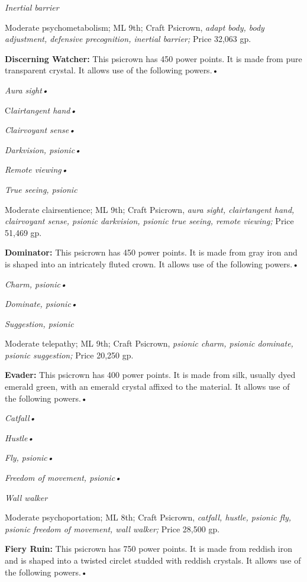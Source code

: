 \documentclass{article}
\begin{document}
\textit{Inertial barrier}

Moderate psychometabolism; ML 9th; Craft Psicrown, \textit{adapt body, body adjustment, 
defensive precognition, inertial barrier; }Price 32,063 gp.

\textbf{Discerning Watcher:} This psicrown has 450 power points. It is made from 
pure transparent crystal. It allows use of the following powers.• 

\textit{Aura sight• }

\parindent=3pt
C\textit{lairtangent hand• }

\parindent=0pt
\textit{Clairvoyant sense• }

\textit{Darkvision, psionic• }

\textit{Remote viewing• }

\textit{True seeing, psionic}

Moderate clairsentience; ML 9th; Craft Psicrown, \textit{aura sight, clairtangent 
hand, clairvoyant sense, psionic darkvision, psionic true seeing, remote viewing; 
}Price 51,469 gp.

\textbf{Dominator: }This psicrown has 450 power points. It is made from gray iron 
and is shaped into an intricately fluted crown. It allows use of the following 
powers.• 

\textit{Charm, psionic• }

\textit{Dominate, psionic• }

\textit{Suggestion, psionic}

Moderate telepathy; ML 9th; Craft Psicrown, \textit{psionic charm, psionic dominate, 
psionic suggestion; }Price 20,250 gp.

\textbf{Evader:} This psicrown has 400 power points. It is made from silk, usually 
dyed emerald green, with an emerald crystal affixed to the material. It allows 
use of the following powers.• 

\textit{Catfall• }

\textit{Hustle• }

\textit{Fly, psionic• }

\textit{Freedom of movement, psionic• }

\textit{Wall walker}

Moderate psychoportation; ML 8th; Craft Psicrown, \textit{catfall, hustle, psionic 
fly, psionic freedom of movement, wall walker; }Price 28,500 gp.

\textbf{Fiery Ruin:} This psicrown has 750 power points. It is made from reddish 
iron and is shaped into a twisted circlet studded with reddish crystals. It allows 
use of the following powers.• 
\end{document}
